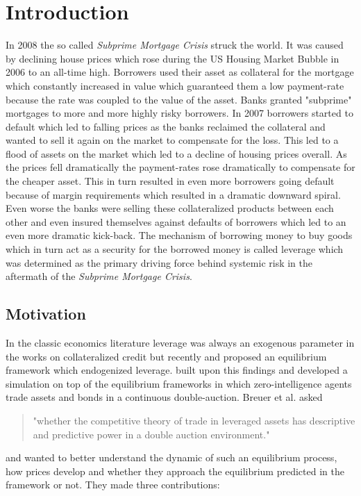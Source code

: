 \documentclass[Bachelorarbeit.tex]{subfiles}
\begin{document}
\chapter{Introduction}
In 2008 the so called \textit{Subprime Mortgage Crisis} struck the world. It was caused by declining house prices which rose during the US Housing Market Bubble in 2006 to an all-time high. Borrowers used their asset as collateral for the mortgage which constantly increased in value which guaranteed them a low payment-rate because the rate was coupled to the value of the asset. Banks granted "subprime" mortgages to more and more highly risky borrowers. In 2007 borrowers started to default which led to falling prices as the banks reclaimed the collateral and wanted to sell it again on the market to compensate for the loss. This led to a flood of assets on the market which led to a decline of housing prices overall. As the prices fell dramatically the payment-rates rose dramatically to compensate for the cheaper asset. This in turn resulted in even more borrowers going default because of margin requirements which resulted in a dramatic downward spiral. Even worse the banks were selling these collateralized products between each other and even insured themselves against defaults of borrowers which led to an even more dramatic kick-back. The mechanism of borrowing money to buy goods which in turn act as a security for the borrowed money is called leverage which was determined as the primary driving force behind systemic risk in the aftermath of the \textit{Subprime Mortgage Crisis}.

\section{Motivation}
In the classic economics literature leverage was always an exogenous parameter in the works on collateralized credit but recently \cite{Geanakoplos2009} and \cite{GeanakoplosZame2014} proposed an equilibrium framework which endogenized leverage. \cite{Breuer2015} built upon this findings and developed a simulation on top of the equilibrium frameworks in which zero-intelligence agents trade assets and bonds in a continuous double-auction. Breuer et al. asked 

\begin{quote}
"whether the competitive theory of trade in leveraged assets has descriptive and predictive power in a double auction environment."
\end{quote}

and wanted to better understand the dynamic of such an equilibrium process, how prices develop and whether they approach the equilibrium predicted in the framework or not. They made three contributions:
\end{document}
